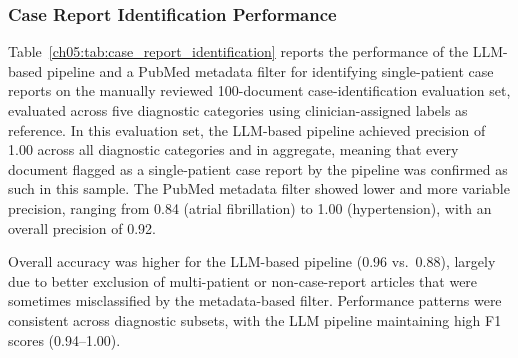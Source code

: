 \ChFiveHeadingOnly
\subsubsection{Case Report Identification Performance}
\label{ch05:sec:case-report-identification-performance}









Table~\ref{ch05:tab:case_report_identification} reports the performance of the LLM-based pipeline and a PubMed metadata filter for identifying single-patient case reports on the manually reviewed 100-document case-identification evaluation set, evaluated across five diagnostic categories using clinician-assigned labels as reference.
In this evaluation set, the LLM-based pipeline achieved precision of 1.00 across all diagnostic categories and in aggregate, meaning that every document flagged as a single-patient case report by the pipeline was confirmed as such in this sample.
The PubMed metadata filter showed lower and more variable precision, ranging from 0.84 (atrial fibrillation) to 1.00 (hypertension), with an overall precision of 0.92. 

Overall accuracy was higher for the LLM-based pipeline (0.96 vs.\ 0.88), largely due to better exclusion of multi-patient or non-case-report articles that were sometimes misclassified by the metadata-based filter.
Performance patterns were consistent across diagnostic subsets, with the LLM pipeline maintaining high F1 scores (0.94--1.00). 

